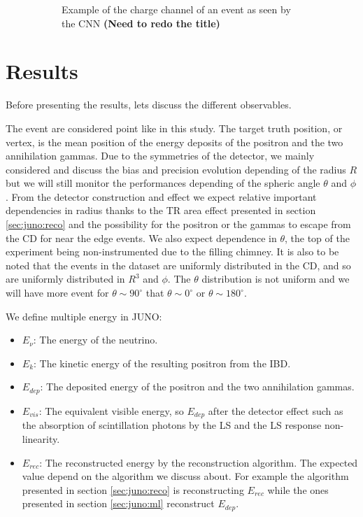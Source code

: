\begin{figure}[ht]
\begin{subfigure}[b]{0.48\textwidth}
    \caption{Example of the charge channel of an event as seen by the CNN \textbf{(Need to redo the title)}}
    \label{fig:jcnn:event_example}
  \end{subfigure}
  \caption{}
\end{figure}

\section{Results}

Before presenting the results, lets discuss the different observables.

The event are considered point like in this study. The target truth position, or vertex, is the mean position of the energy deposits of the positron and the two annihilation gammas. Due to the symmetries of the detector, we mainly considered and discuss the bias and precision evolution depending of the radius $R$ but we will still monitor the performances depending of the spheric angle $\theta$ and $\phi$. From the detector construction and effect we expect relative important dependencies in radius thanks to the TR area effect presented in section \ref{sec:juno:reco} and the possibility for the positron or the gammas to escape from the CD for near the edge events. We  also expect dependence in $\theta$, the top of the experiment being non-instrumented due to the filling chimney. It is also to be noted that the events in the dataset are uniformly distributed in the CD, and so are uniformly distributed in $R^3$ and $\phi$. The $\theta$ distribution is not uniform and we will have more event for $\theta \sim 90^{\circ}$ that $\theta \sim 0^{\circ}$ or $\theta \sim 180^{\circ}$.

We define multiple energy in JUNO:
\begin{itemize}
  \item $E_\nu$: The energy of the neutrino.
  \item $E_k$: The kinetic energy of the resulting positron from the IBD.
  \item $E_{dep}$: The deposited energy of the positron and the two annihilation gammas.
  \item $E_{vis}$: The equivalent visible energy, so $E_{dep}$ after the detector effect such as the absorption of scintillation photons by the LS and the LS response non-linearity.
  \item $E_{rec}$: The reconstructed energy by the reconstruction algorithm. The expected value depend on the algorithm we discuss about. For example the algorithm presented in section \ref{sec:juno:reco} is reconstructing $E_{rec}$ while the ones presented in section \ref{sec:juno:ml} reconstruct $E_{dep}$.
\end{itemize}

